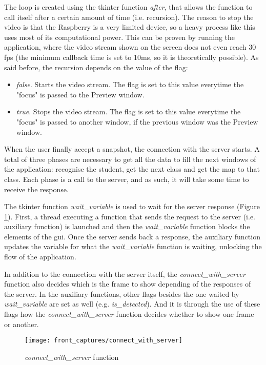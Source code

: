 The loop is created using the tkinter function \textit{after}, that allows the function to call itself after a certain amount of time (i.e. recursion). The reason to stop the video is that the Raspberry is a very limited device, so a heavy process like this uses most of its computational power. This can be proven by running the application, where the video stream shown on the screen does not even reach 30 \gls{fps} (the minimum callback time is set to 10ms, so it is theoretically possible). As said before, the recursion depends on the value of the flag:

\begin{itemize}
	\item \textit{false}. Starts the video stream. The flag is set to this value everytime the "focus" is passed to the Preview window.
	\item \textit{true}. Stops the video stream. The flag is set to this value everytime the "focus" is passed to another window, if the previous window was the Preview window.
\end{itemize}

When the user finally accept a snapshot, the connection with the server starts. A total of three phases are necessary to get all the data to fill the next windows of the application: recognise the student, get the next class and get the map to that class. Each phase is a call to the server, and as such, it will take some time to receive the response.

The tkinter function \textit{wait{\_}variable} is used to wait for the server response (Figure \ref{fig:connect_with_server}). First, a thread executing a function that sends the request to the server (i.e. auxiliary function) is launched and then the \textit{wait{\_}variable} function blocks the elements of the \gls{gui}. Once the server sends back a response, the auxiliary function updates the variable for what the \textit{wait{\_}variable} function is waiting, unlocking the flow of the application. 

In addition to the connection with the server itself, the \textit{connect{\_}with{\_}server} function also decides which is the frame to show depending of the responses of the server. In the auxiliary functions, other flags besides the one waited by \textit{wait{\_}variable} are set as well (e.g. \textit{is{\_}detected}). And it is through the use of these flags how the \textit{connect{\_}with{\_}server} function decides whether to show one frame or another. 

\begin{figure}[!ht]
	\centering
	\texttt{[image: front\_captures/connect\_with\_server]}
	\caption{\textit{connect{\_}with{\_}server} function}
	\label{fig:connect_with_server}
\end{figure}

